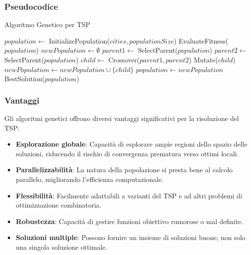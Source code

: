 \subsubsection{Pseudocodice}


\begin{algorithm}
	\caption{Algoritmo Genetico per \gls{TSP}}\label{alg:geneticalgorithm}
	\begin{algorithmic}[1]
		\State $population \gets$ InitializePopulation($cities, populationSize$)
		\State EvaluateFitness($population$)
		\State $newPopulation \gets \emptyset$
		\State $parent1 \gets$ SelectParent($population$)
		\State $parent2 \gets$ SelectParent($population$)
		\State $child \gets$ Crossover($parent1, parent2$)
		\State Mutate($child$)
		\EndIf
		\State $newPopulation \gets newPopulation \cup \{child\}$
		\EndWhile
		\State $population \gets newPopulation$
		\EndFor
		\State \Return BestSolution($population$)
		\EndProcedure
	\end{algorithmic}
\end{algorithm}

\subsubsection{Vantaggi}

Gli algoritmi genetici offrono diversi vantaggi significativi per la risoluzione del \gls{TSP}:

\begin{itemize}
	\item \textbf{Esplorazione globale}: Capacità di esplorare ampie regioni dello spazio delle soluzioni, riducendo il rischio di convergenza prematura verso ottimi locali.
	\item \textbf{Parallelizzabilità}: La natura della popolazione si presta bene al calcolo parallelo, migliorando l'efficienza computazionale.
	\item \textbf{Flessibilità}: Facilmente adattabili a varianti del \gls{TSP} e ad altri problemi di ottimizzazione combinatoria.
	\item \textbf{Robustezza}: Capacità di gestire funzioni obiettivo rumorose o mal definite.
	\item \textbf{Soluzioni multiple}: Possono fornire un insieme di soluzioni buone, non solo una singola soluzione ottimale.
\end{itemize}

